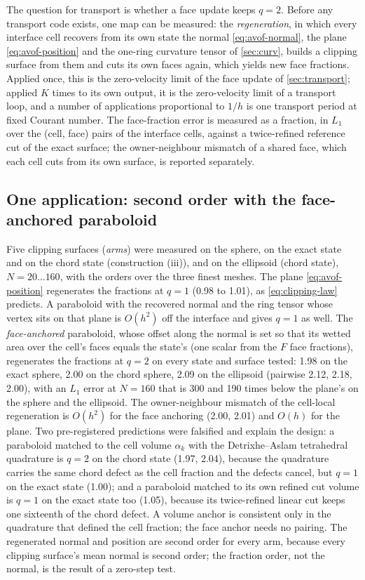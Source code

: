 \documentclass[preprint,12pt]{elsarticle}
\begin{document}
The question for transport is whether a face update keeps $q = 2$. Before any transport code exists, one map can be measured: the \emph{regeneration}, in which every interface cell recovers from its own state the normal \cref{eq:avof-normal}, the plane \cref{eq:avof-position} and the one-ring curvature tensor of \cref{sec:curv}, builds a clipping surface from them and cuts its own faces again, which yields new face fractions. Applied once, this is the zero-velocity limit of the face update of \cref{sec:transport}; applied $K$ times to its own output, it is the zero-velocity limit of a transport loop, and a number of applications proportional to $1/h$ is one transport period at fixed Courant number. The face-fraction error is measured as a fraction, in $L_1$ over the (cell, face) pairs of the interface cells, against a twice-refined reference cut of the exact surface; the owner-neighbour mismatch of a shared face, which each cell cuts from its own surface, is reported separately.

\subsection{One application: second order with the face-anchored paraboloid}

Five clipping surfaces (\emph{arms}) were measured on the sphere, on the exact state and on the chord state (construction (iii)), and on the ellipsoid (chord state), $N = 20 \ldots 160$, with the orders over the three finest meshes. The plane \cref{eq:avof-position} regenerates the fractions at $q = 1$ (0.98 to 1.01), as \cref{eq:clipping-law} predicts. A paraboloid with the recovered normal and the ring tensor whose vertex sits on that plane is $O(h^2)$ off the interface and gives $q = 1$ as well. The \emph{face-anchored} paraboloid, whose offset along the normal is set so that its wetted area over the cell's faces equals the state's (one scalar from the $F$ face fractions), regenerates the fractions at $q = 2$ on every state and surface tested: 1.98 on the exact sphere, 2.00 on the chord sphere, 2.09 on the ellipsoid (pairwise 2.12, 2.18, 2.00), with an $L_1$ error at $N = 160$ that is 300 and 190 times below the plane's on the sphere and the ellipsoid. The owner-neighbour mismatch of the cell-local regeneration is $O(h^2)$ for the face anchoring (2.00, 2.01) and $O(h)$ for the plane. Two pre-registered predictions were falsified and explain the design: a paraboloid matched to the cell volume $\alpha_k$ with the Detrixhe--Aslam tetrahedral quadrature is $q = 2$ on the chord state (1.97, 2.04), because the quadrature carries the same chord defect as the cell fraction and the defects cancel, but $q = 1$ on the exact state (1.00); and a paraboloid matched to its own refined cut volume is $q = 1$ on the exact state too (1.05), because its twice-refined linear cut keeps one sixteenth of the chord defect. A volume anchor is consistent only in the quadrature that defined the cell fraction; the face anchor needs no pairing. The regenerated normal and position are second order for every arm, because every clipping surface's mean normal is second order; the fraction order, not the normal, is the result of a zero-step test.
\end{document}
